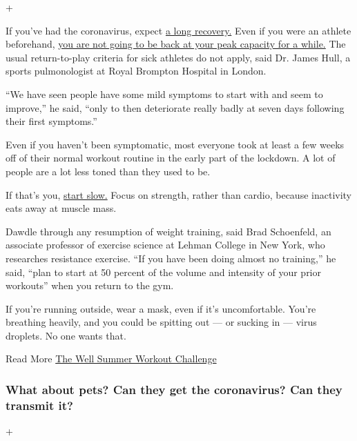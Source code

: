 +

If you've had the coronavirus, expect
\href{https://www.nytimes.com/2020/05/06/opinion/coronavirus-recovery.html}{a
long recovery.} Even if you were an athlete beforehand,
\href{https://www.nytimes.com/2020/05/20/well/returning-to-exercise-training-recovery-coronavirus.html}{you
are not going to be back at your peak capacity for a while.} The usual
return-to-play criteria for sick athletes do not apply, said Dr. James
Hull, a sports pulmonologist at Royal Brompton Hospital in London.

``We have seen people have some mild symptoms to start with and seem to
improve,'' he said, ``only to then deteriorate really badly at seven
days following their first symptoms.''

Even if you haven't been symptomatic, most everyone took at least a few
weeks off of their normal workout routine in the early part of the
lockdown. A lot of people are a lot less toned than they used to be.

If that's you,
\href{https://www.nytimes.com/2020/06/01/well/move/coronavirus-exercise-lockdown-quarantine-sports-weights-running-injuries.html}{start
slow.} Focus on strength, rather than cardio, because inactivity eats
away at muscle mass.

Dawdle through any resumption of weight training, said Brad Schoenfeld,
an associate professor of exercise science at Lehman College in New
York, who researches resistance exercise. ``If you have been doing
almost no training,'' he said, ``plan to start at 50 percent of the
volume and intensity of your prior workouts'' when you return to the
gym.

If you're running outside, wear a mask, even if it's uncomfortable.
You're breathing heavily, and you could be spitting out --- or sucking
in --- virus droplets. No one wants that.

 Read More
\href{https://www.nytimes.com/2020/07/02/well/move/the-well-summer-workout-challenge.html}{The
Well Summer Workout Challenge}

\hypertarget{what-about-pets-can-they-get-the-coronavirus-can-they-transmit-it}{%
\subsubsection{What about pets? Can they get the coronavirus? Can they
transmit
it?}\label{what-about-pets-can-they-get-the-coronavirus-can-they-transmit-it}}

+

